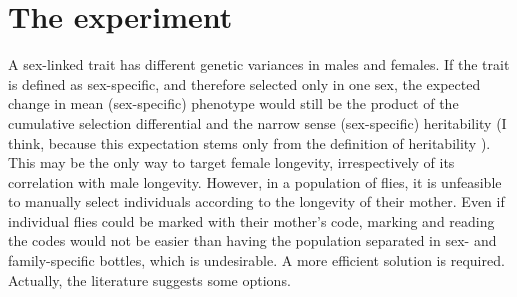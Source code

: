 \documentclass[a4paper,12pt]{article}
\begin{document}

\section{The experiment}
A sex-linked trait has different genetic variances in males and females. If the trait is defined as sex-specific, and therefore selected only in one sex, the expected change in mean (sex-specific) phenotype would still be the product of the cumulative selection differential and the narrow sense (sex-specific) heritability (I think, because this expectation stems only from the definition of heritability \citep[page XX]{Falconer1989}). This may be the only way to target female longevity, irrespectively of its correlation with male longevity. However, in a population of flies, it is unfeasible to manually select individuals according to the longevity of their mother. Even if individual flies could be marked with their mother's code, marking and reading the codes would not be easier than having the population separated in sex- and family-specific bottles, which is undesirable. A more efficient solution is required. Actually, the literature suggests some options.
\end{document}
